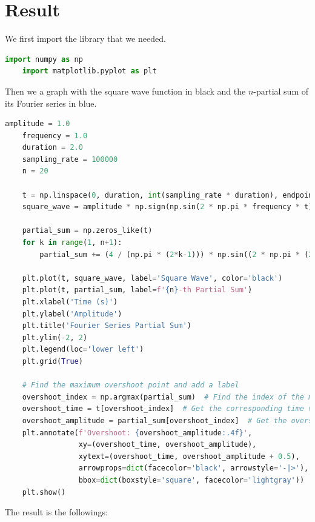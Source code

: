 \documentclass[12pt]{article}
\theoremstyle{definition}
\begin{document}
\newpage

\section{Result}

We first import the library that we needed.
\begin{lstlisting}[language=Python]
    import numpy as np
    import matplotlib.pyplot as plt
\end{lstlisting}

Then we a graph with the square wave function in black and the $n$-partial sum of its Fourier series in blue.
\begin{lstlisting}[language=Python]
    amplitude = 1.0
    frequency = 1.0
    duration = 2.0
    sampling_rate = 100000
    n = 20

    t = np.linspace(0, duration, int(sampling_rate * duration), endpoint=False)
    square_wave = amplitude * np.sign(np.sin(2 * np.pi * frequency * t))

    partial_sum = np.zeros_like(t)
    for k in range(1, n+1):
        partial_sum += (4 / (np.pi * (2*k-1))) * np.sin((2 * np.pi * (2*k-1) * frequency * t))

    plt.plot(t, square_wave, label='Square Wave', color='black')
    plt.plot(t, partial_sum, label=f'{n}-th Partial Sum')
    plt.xlabel('Time (s)')
    plt.ylabel('Amplitude')
    plt.title('Fourier Series Partial Sum')
    plt.ylim(-2, 2)
    plt.legend(loc='lower left')
    plt.grid(True)

    # Find the maximum overshoot point and add a label
    overshoot_index = np.argmax(partial_sum)  # Find the index of the maximum overshoot
    overshoot_time = t[overshoot_index]  # Get the corresponding time value
    overshoot_amplitude = partial_sum[overshoot_index]  # Get the overshoot amplitude
    plt.annotate(f'Overshoot: {overshoot_amplitude:.4f}',
                 xy=(overshoot_time, overshoot_amplitude),
                 xytext=(overshoot_time, overshoot_amplitude + 0.5),
                 arrowprops=dict(facecolor='black', arrowstyle='-|>'),
                 bbox=dict(boxstyle='square', facecolor='lightgray'))
    plt.show()
\end{lstlisting}

\newpage

The result is the followings:
\end{document}

